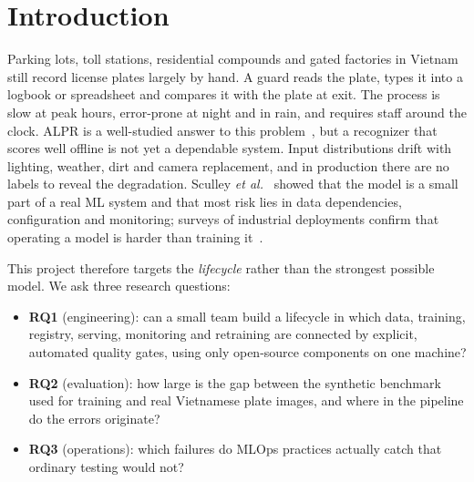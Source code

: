 \documentclass[conference]{IEEEtran}
\begin{document}
\section{Introduction}
Parking lots, toll stations, residential compounds and gated factories in
Vietnam still record license plates largely by hand. A guard reads the plate,
types it into a logbook or spreadsheet and compares it with the plate at exit.
The process is slow at peak hours, error-prone at night and in rain, and
requires staff around the clock. ALPR is a well-studied answer to this
problem~\cite{du2013alpr,silva2018alpr}, but a recognizer that scores well offline
is not yet a dependable system. Input distributions drift with lighting, weather,
dirt and camera replacement, and in production there are no labels to reveal the
degradation. Sculley \emph{et al.}~\cite{sculley2015debt} showed that the model is
a small part of a real ML system and that most risk lies in data dependencies,
configuration and monitoring; surveys of industrial deployments confirm that
operating a model is harder than training it~\cite{amershi2019se4ml,paleyes2022challenges}.

This project therefore targets the \emph{lifecycle} rather than the strongest
possible model. We ask three research questions:
\begin{itemize}
\item \textbf{RQ1} (engineering): can a small team build a lifecycle in which
data, training, registry, serving, monitoring and retraining are connected by
explicit, automated quality gates, using only open-source components on one
machine?
\item \textbf{RQ2} (evaluation): how large is the gap between the synthetic
benchmark used for training and real Vietnamese plate images, and where in the
pipeline do the errors originate?
\item \textbf{RQ3} (operations): which failures do MLOps practices actually
catch that ordinary testing would not?
\end{itemize}
\end{document}
